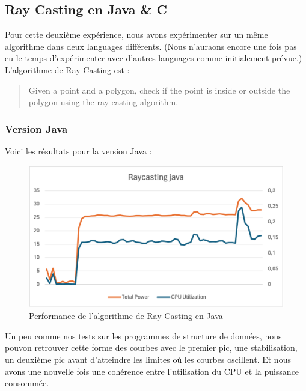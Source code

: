 \documentclass[12pt, a4paper]{report}
\begin{document}
\subsection{Ray Casting en Java & C}
Pour cette deuxième expérience, nous avons expérimenter sur un même algorithme dans deux languages différents. (Nous n'auraons encore une fois pas eu le temps d'expérimenter avec d'autres languages comme initialement prévue.)
L'algorithme de Ray Casting est :
\begin{quote}
    Given a point and a polygon, check if the point is inside or outside the polygon using the ray-casting algorithm.
\end{quote}\cite{wiki:xxx}

\subsubsection{Version Java}
Voici les résultats pour la version Java :
\begin{figure}[H]
    \includegraphics[width=1\linewidth]{res/graph/Raycasting/raycasting java.png}
    \caption{Performance de l'algorithme de Ray Casting en Java}
    \label{fig:java_raycasting}
\end{figure}

Un peu comme nos tests sur les programmes de structure de données, nous pouvon retrouver cette forme des courbes avec le premier pic, une stabilisation, un deuxième pic avant d'atteindre les limites où les courbes oscillent. 
Et nous avons une nouvelle fois une cohérence entre l'utilisation du CPU et la puissance consommée.
\end{document}
